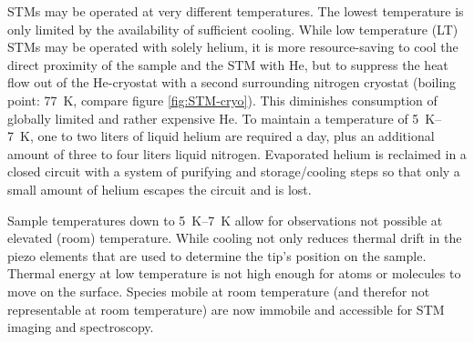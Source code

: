 STMs may be operated at very different temperatures. The lowest temperature is only limited by the availability of sufficient cooling. While low temperature (LT) STMs may be operated with solely helium, it is more resource-saving to cool the direct proximity of the sample and the STM with He, but to suppress the heat flow out of the He-cryostat with a second surrounding nitrogen cryostat (boiling point: \SI{77}{\K}, compare figure \ref{fig:STM-cryo}). This diminishes consumption of globally limited and rather expensive He. To maintain a temperature of \SIrange{5}{7}{\K}, one to two liters of liquid helium are required a day, plus an additional amount of three to four liters liquid nitrogen. Evaporated helium is reclaimed in a closed circuit with a system of purifying and storage/cooling steps so that only a small amount of helium escapes the circuit and is lost.

Sample temperatures down to \SIrange{5}{7}{\K} allow for observations not possible at elevated (room) temperature. While cooling not only reduces thermal drift in the piezo elements that are used to determine the tip's position on the sample. Thermal energy at low temperature is not high enough for atoms or molecules to move on the surface. Species mobile at room temperature (and therefor not representable at room temperature) are now immobile and accessible for STM imaging and spectroscopy.

